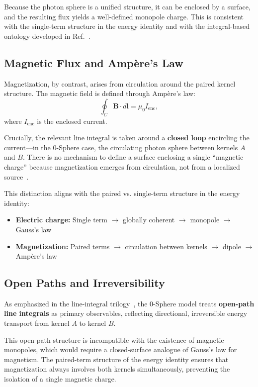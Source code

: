 \documentclass[12pt,letterpaper]{article}
\begin{document}
Because the photon sphere is a unified structure, it can be enclosed by a surface, and the resulting flux yields a well-defined monopole charge. This is consistent with the single-term structure in the energy identity and with the integral-based ontology developed in Ref.~\cite{hanamura18275142}.

\subsection{Magnetic Flux and Ampère's Law}

Magnetization, by contrast, arises from circulation around the paired kernel structure. The magnetic field is defined through Amp\`ere's law:
\begin{equation}
\oint_C \mathbf{B} \cdot d\mathbf{l} = \mu_0 I_{\mathrm{enc}},
\end{equation}
where $I_{\mathrm{enc}}$ is the enclosed current.

Crucially, the relevant line integral is taken around a \textbf{closed loop} encircling the current—in the 0-Sphere case, the circulating photon sphere between kernels $A$ and $B$. There is no mechanism to define a surface enclosing a single ``magnetic charge'' because magnetization emerges from circulation, not from a localized source~\cite{hanamura18203433}.

This distinction aligns with the paired vs. single-term structure in the energy identity:
\begin{itemize}
\item \textbf{Electric charge:} Single term $\to$ globally coherent $\to$ monopole $\to$ Gauss's law
\item \textbf{Magnetization:} Paired terms $\to$ circulation between kernels $\to$ dipole $\to$ Amp\`ere's law
\end{itemize}

\subsection{Open Paths and Irreversibility}

As emphasized in the line-integral trilogy~\cite{hanamura18067760,hanamura18135855,hanamura18203433}, the 0-Sphere model treats \textbf{open-path line integrals} as primary observables, reflecting directional, irreversible energy transport from kernel $A$ to kernel $B$.

This open-path structure is incompatible with the existence of magnetic monopoles, which would require a closed-surface analogue of Gauss's law for magnetism. The paired-term structure of the energy identity ensures that magnetization always involves both kernels simultaneously, preventing the isolation of a single magnetic charge.
\end{document}
